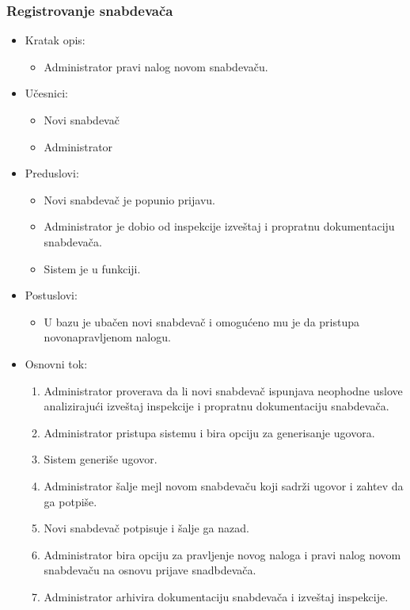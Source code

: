 \subsubsection{Registrovanje snabdevača}

\begin{itemize}
	\item Kratak opis:
		\begin{itemize}
			\item Administrator pravi nalog novom snabdevaču.
		\end{itemize}
	\item Učesnici:
		\begin{itemize}
			\item Novi snabdevač
			\item Administrator
		\end{itemize}				
	\item Preduslovi:
		\begin{itemize}
		    \item Novi snabdevač je popunio prijavu.
		    \item Administrator je dobio od inspekcije izveštaj i propratnu dokumentaciju snabdevača. %
		    \item Sistem je u funkciji.
		\end{itemize}
	\item Postuslovi:
		\begin{itemize}
			\item U bazu je ubačen novi snabdevač i omogućeno mu je da pristupa novonapravljenom nalogu.
		\end{itemize}		
	\item Osnovni tok:
		\begin{enumerate}
		    \item Administrator proverava da li novi snabdevač ispunjava neophodne uslove analizirajući izveštaj inspekcije i propratnu dokumentaciju snabdevača.
		    \item Administrator pristupa sistemu i bira opciju za generisanje ugovora. 
		    \item Sistem generiše ugovor.
		    \item Administrator šalje mejl novom snabdevaču koji sadrži ugovor i zahtev da ga potpiše.
		    \item Novi snabdevač potpisuje i šalje ga nazad.
		    \item Administrator bira opciju za pravljenje novog naloga i pravi nalog novom snabdevaču na osnovu prijave snadbdevača.
		    \item Administrator arhivira dokumentaciju snabdevača i izveštaj inspekcije.

\end{enumerate}
\end{itemize}

